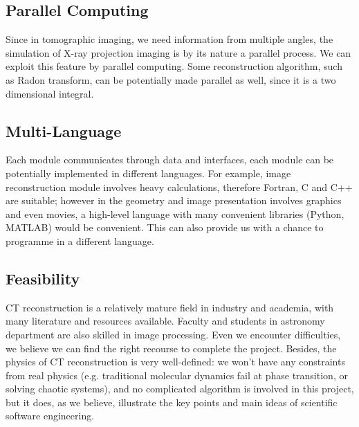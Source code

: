 \documentclass[11]{article}
\begin{document}
\subsection{Parallel Computing}
	Since in tomographic imaging, we need information from multiple angles, the simulation of X-ray projection imaging is by its nature a parallel process. We can exploit this feature by parallel computing. Some reconstruction algorithm, such as Radon transform, can be potentially made parallel as well, since it is a two dimensional integral.

\subsection{Multi-Language}
	Each module communicates through data and interfaces, each module can be potentially implemented in different languages. For example, image reconstruction module involves heavy calculations, therefore Fortran, C and C++ are suitable; however in the geometry and image presentation involves graphics and even movies, a high-level language with many convenient libraries (Python, MATLAB) would be convenient. This can also provide us with a chance to programme in a different language.

\subsection{Feasibility}
	CT reconstruction is a relatively mature field in industry and academia, with many literature and resources available. Faculty and students in astronomy department are also skilled in image processing. Even we encounter difficulties, we believe we can find the right recourse to complete the project. Besides, the physics of CT reconstruction is very well-defined: we won't have any constraints from real physics (e.g. traditional molecular dynamics fail at phase transition, or solving chaotic systems), and no complicated algorithm is involved in this project, but it does, as we believe, illustrate the key points and main ideas of scientific software engineering.
	
\end{document}
